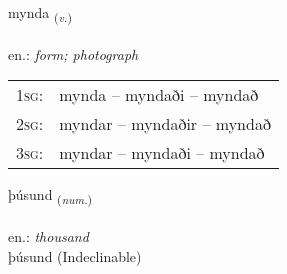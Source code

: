 \documentclass[frontgrid, backgrid]{flacards}\usepackage[]{graphicx}\usepackage[]{xcolor}
\begin{document}
\renewcommand{\flhead}{\vskip5pt \fboxsep=0pt {\small\bfseries\footnotesize Sagnorð | Verb}}
\renewcommand{\fcfoot}{\vskip5pt \fboxsep=0pt \hspace{2pt}{\small\bfseries\footnotesize 1K}}

\renewcommand{\blhead}{\vskip5pt {\small\bfseries\footnotesize Sagnorð | Verb }}
\renewcommand{\bcfoot}{\vskip5pt \hspace{2pt}{\small\bfseries\footnotesize 1K}}


{mynda \small{\textsubscript{(\textit{v.})}} \\[1ex] %
\textphonetic{[mɪnta]} \\
en.: \emph{form; photograph} \\  [2ex]
\renewcommand*{\arraystretch}{0.8}
\begin{tabular}{p{1cm}l}
\textsc{1sg}: & mynda -- myndaði -- myndað \\ 
\textsc{2sg}: & myndar -- myndaðir -- myndað \\ 
\textsc{3sg}: & myndar -- myndaði -- myndað \\ 
\end{tabular}
}


\renewcommand{\flhead}{\vskip5pt \fboxsep=0pt {\small\bfseries\footnotesize Töluorð | Numeral}}
\renewcommand{\fcfoot}{\vskip5pt \fboxsep=0pt \hspace{2pt}{\small\bfseries\footnotesize 1K}}

\renewcommand{\blhead}{\vskip5pt {\small\bfseries\footnotesize Töluorð | Numeral }}
\renewcommand{\bcfoot}{\vskip5pt \hspace{2pt}{\small\bfseries\footnotesize 1K}}


{þúsund \small{\textsubscript{(\textit{num.})}} \\[1ex]
\textphonetic{[θuːsʏnt]} \\
en.: \emph{thousand} \\  [2ex]
þúsund (Indeclinable)}

\renewcommand{\flhead}{\vskip5pt \fboxsep=0pt {\small\bfseries\footnotesize Nafnorð | Noun}}
\renewcommand{\fcfoot}{\vskip5pt \fboxsep=0pt \hspace{2pt}{\small\bfseries\footnotesize 1K}}
\end{document}
